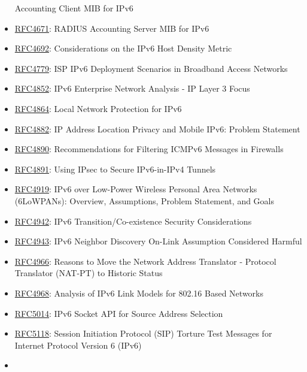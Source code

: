 \documentclass[
]{article}
\begin{document}
\begin{itemize}
  Accounting Client MIB for IPv6
\item
  \href{https://www.rfc-editor.org/info/rfc4671}{RFC4671}: RADIUS
  Accounting Server MIB for IPv6
\item
  \href{https://www.rfc-editor.org/info/rfc4692}{RFC4692}:
  Considerations on the IPv6 Host Density Metric
\item
  \href{https://www.rfc-editor.org/info/rfc4779}{RFC4779}: ISP IPv6
  Deployment Scenarios in Broadband Access Networks
\item
  \href{https://www.rfc-editor.org/info/rfc4852}{RFC4852}: IPv6
  Enterprise Network Analysis - IP Layer 3 Focus
\item
  \href{https://www.rfc-editor.org/info/rfc4864}{RFC4864}: Local Network
  Protection for IPv6
\item
  \href{https://www.rfc-editor.org/info/rfc4882}{RFC4882}: IP Address
  Location Privacy and Mobile IPv6: Problem Statement
\item
  \href{https://www.rfc-editor.org/info/rfc4890}{RFC4890}:
  Recommendations for Filtering ICMPv6 Messages in Firewalls
\item
  \href{https://www.rfc-editor.org/info/rfc4891}{RFC4891}: Using IPsec
  to Secure IPv6-in-IPv4 Tunnels
\item
  \href{https://www.rfc-editor.org/info/rfc4919}{RFC4919}: IPv6 over
  Low-Power Wireless Personal Area Networks (6LoWPANs): Overview,
  Assumptions, Problem Statement, and Goals
\item
  \href{https://www.rfc-editor.org/info/rfc4942}{RFC4942}: IPv6
  Transition/Co-existence Security Considerations
\item
  \href{https://www.rfc-editor.org/info/rfc4943}{RFC4943}: IPv6 Neighbor
  Discovery On-Link Assumption Considered Harmful
\item
  \href{https://www.rfc-editor.org/info/rfc4966}{RFC4966}: Reasons to
  Move the Network Address Translator - Protocol Translator (NAT-PT) to
  Historic Status
\item
  \href{https://www.rfc-editor.org/info/rfc4968}{RFC4968}: Analysis of
  IPv6 Link Models for 802.16 Based Networks
\item
  \href{https://www.rfc-editor.org/info/rfc5014}{RFC5014}: IPv6 Socket
  API for Source Address Selection
\item
  \href{https://www.rfc-editor.org/info/rfc5118}{RFC5118}: Session
  Initiation Protocol (SIP) Torture Test Messages for Internet Protocol
  Version 6 (IPv6)
\item

\end{itemize}
\end{document}
